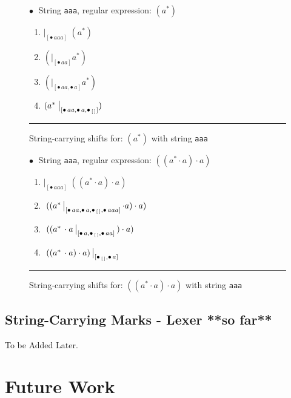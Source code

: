 \documentclass[12pt]{article}
\newcommand{\Marked}[1]{\bullet\,#1}
\newcommand{\emptylist}{[\,]}
\begin{document}
\begin{figure}[ht]
  $\bullet\;$ String \texttt{aaa}, regular expression: $(a^*)$
  \begin{center}
    \begin{enumerate}
      \item $\bigl|_{[\Marked{aaa}]} \;(a^*)$
      \item $(\bigl|_{[\Marked{aa}]} a^*)$
      \item $( \bigl|_{[\Marked{aa}, \Marked{a}]} a^*)$
      \item $(a^* \;\bigl|_{[\Marked{aa}, \Marked{a}, \Marked_{\emptylist}]})$
    \end{enumerate}
  \end{center}

  \mbox{}
  \hrule
  \caption{String-carrying shifts for: $(a^*)$ with string \texttt{aaa}}
  \label{StringShiftsExample2}
\end{figure}

\begin{figure}[ht]
  $\bullet\;$ String \texttt{aaa}, regular expression: $((a^* \cdot a) \cdot a)$ %
  \begin{center}
    \begin{enumerate}
      \item $\bigl|_{[\Marked{aaa}]} \;((a^* \cdot a) \cdot a)$
      \item $ \;((a^*\, \bigl|_{[\Marked{aa}, \Marked{a}, \Marked_{\emptylist},\Marked{aaa}]}\, \cdot a) \cdot a)$
      \item $ \;((a^*\, \cdot a \, \bigl|_{[\Marked{a}, \Marked_{\emptylist},\Marked{aa}]}\,) \cdot a)$
      \item $ \;((a^*\, \cdot a  ) \cdot a)\, \bigl|_{[\Marked_{\emptylist},\Marked{a}]}$
    \end{enumerate}
  \end{center}
  \mbox{}
  \hrule
  \caption{String-carrying shifts for: $((a^* \cdot a) \cdot a)$ with string \texttt{aaa}}
  \label{StringShiftsExample3}
\end{figure}

\FloatBarrier
\subsection{String-Carrying Marks - Lexer **so far**}
To be Added Later.
\section{Future Work}
\end{document}
